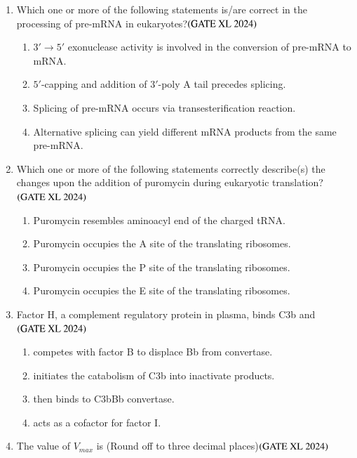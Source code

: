 \documentclass[journal]{IEEEtran}
\begin{document}
\begin{enumerate}
    \item Which one or more of the following statements is/are correct in the processing of pre-mRNA in eukaryotes?\hfill $\left(\text{GATE XL 2024}\right)$
    \begin{enumerate}
        \item $3' \rightarrow 5'$ exonuclease activity is involved in the conversion of pre-mRNA to mRNA.
        \item $5'$-capping and addition of $3'$-poly A tail precedes splicing.
        \item Splicing of pre-mRNA occurs via transesterification reaction.
        \item Alternative splicing can yield different mRNA products from the same pre-mRNA.
    \end{enumerate}

    \item Which one or more of the following statements correctly describe(s) the changes upon the addition of puromycin during eukaryotic translation?\hfill $\left(\text{GATE XL 2024}\right)$
    \begin{enumerate}
        \item Puromycin resembles aminoacyl end of the charged tRNA.
        \item Puromycin occupies the A site of the translating ribosomes.
        \item Puromycin occupies the P site of the translating ribosomes.
        \item Puromycin occupies the E site of the translating ribosomes.
    \end{enumerate}

    \item Factor H, a complement regulatory protein in plasma, binds C3b and\hfill $\left(\text{GATE XL 2024}\right)$
    \begin{enumerate}
            \item competes with factor B to displace Bb from convertase.
            \item initiates the catabolism of C3b into inactivate products.
            \item then binds to C3bBb convertase.
            \item acts as a cofactor for factor I.
    \end{enumerate}

    \item The value of $V_{max}$ is (Round off to three decimal places)\hfill $\left(\text{GATE XL 2024}\right)$


\end{enumerate}
\end{document}
